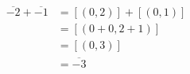 \documentclass[preview]{standalone}
\begin{document}
\begin{align*}
\overline{-2} + \overline{-1} &= \left[(0, 2)\right] + \left[(0, 1)\right] \\ &= \left[(0 + 0, 2 + 1)\right] \\ &= \left[(0, 3)\right] \\ &= \overline{-3} \\
\end{align*}
\end{document}
